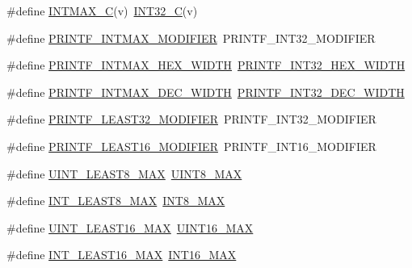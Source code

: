 \begin{DoxyCompactItemize}
\item 
\#define \hyperlink{orstdint_8h_a6b556b8b5f86e13f1c2a6e8f9b9b4966}{I\-N\-T\-M\-A\-X\-\_\-\-C}(v)~\hyperlink{stdint_8h_ad78650fb7726f4e99205406569ef403d}{I\-N\-T32\-\_\-\-C}(v)
\item 
\#define \hyperlink{orstdint_8h_ad53dd320ab0f0e9f4266bc225a3487df}{P\-R\-I\-N\-T\-F\-\_\-\-I\-N\-T\-M\-A\-X\-\_\-\-M\-O\-D\-I\-F\-I\-E\-R}~P\-R\-I\-N\-T\-F\-\_\-\-I\-N\-T32\-\_\-\-M\-O\-D\-I\-F\-I\-E\-R
\item 
\#define \hyperlink{orstdint_8h_af88f43dbd7532680862099ef08421799}{P\-R\-I\-N\-T\-F\-\_\-\-I\-N\-T\-M\-A\-X\-\_\-\-H\-E\-X\-\_\-\-W\-I\-D\-T\-H}~\hyperlink{orstdint_8h_ae6f04461e1801eefd3b64f3b851abed8}{P\-R\-I\-N\-T\-F\-\_\-\-I\-N\-T32\-\_\-\-H\-E\-X\-\_\-\-W\-I\-D\-T\-H}
\item 
\#define \hyperlink{orstdint_8h_a9c269e817611c8344b5d13cdedbd4465}{P\-R\-I\-N\-T\-F\-\_\-\-I\-N\-T\-M\-A\-X\-\_\-\-D\-E\-C\-\_\-\-W\-I\-D\-T\-H}~\hyperlink{orstdint_8h_aa7207fcbdc05d7cf877066028543c28b}{P\-R\-I\-N\-T\-F\-\_\-\-I\-N\-T32\-\_\-\-D\-E\-C\-\_\-\-W\-I\-D\-T\-H}
\item 
\#define \hyperlink{orstdint_8h_a861aa5c171bcd4ac1438845bf9b183e1}{P\-R\-I\-N\-T\-F\-\_\-\-L\-E\-A\-S\-T32\-\_\-\-M\-O\-D\-I\-F\-I\-E\-R}~P\-R\-I\-N\-T\-F\-\_\-\-I\-N\-T32\-\_\-\-M\-O\-D\-I\-F\-I\-E\-R
\item 
\#define \hyperlink{orstdint_8h_ae050ead9591f8e4e8368fe01076e7da4}{P\-R\-I\-N\-T\-F\-\_\-\-L\-E\-A\-S\-T16\-\_\-\-M\-O\-D\-I\-F\-I\-E\-R}~P\-R\-I\-N\-T\-F\-\_\-\-I\-N\-T16\-\_\-\-M\-O\-D\-I\-F\-I\-E\-R
\item 
\#define \hyperlink{orstdint_8h_a2a80bde77ee1698d0f42f334adad4f2b}{U\-I\-N\-T\-\_\-\-L\-E\-A\-S\-T8\-\_\-\-M\-A\-X}~\hyperlink{stdint_8h_aeb4e270a084ee26fe73e799861bd0252}{U\-I\-N\-T8\-\_\-\-M\-A\-X}
\item 
\#define \hyperlink{orstdint_8h_aa05109908fb2770f632d2b646b9f85bf}{I\-N\-T\-\_\-\-L\-E\-A\-S\-T8\-\_\-\-M\-A\-X}~\hyperlink{stdint_8h_aaf7f29f45f1a513b4748a4e5014ddf6a}{I\-N\-T8\-\_\-\-M\-A\-X}
\item 
\#define \hyperlink{orstdint_8h_a6ef6a1a518bbf516ca8b0180b11c358f}{U\-I\-N\-T\-\_\-\-L\-E\-A\-S\-T16\-\_\-\-M\-A\-X}~\hyperlink{stdint_8h_a3ea490c9b3617d4479bd80ef93cd5602}{U\-I\-N\-T16\-\_\-\-M\-A\-X}
\item 
\#define \hyperlink{orstdint_8h_a7eb2a8e2a1c65d6c9ad0f86154890baa}{I\-N\-T\-\_\-\-L\-E\-A\-S\-T16\-\_\-\-M\-A\-X}~\hyperlink{stdint_8h_ac58f2c111cc9989c86db2a7dc4fd84ca}{I\-N\-T16\-\_\-\-M\-A\-X}
\item 

\end{DoxyCompactItemize}
